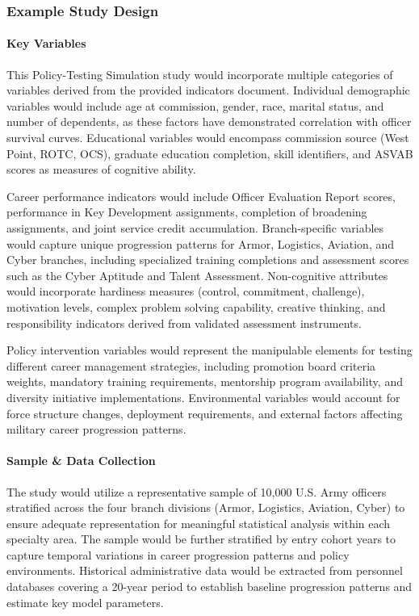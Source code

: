 \documentclass[main.tex]{subfiles}
\begin{document}
\subsubsection{Example Study Design}

\paragraph{Key Variables}

This Policy-Testing Simulation study would incorporate multiple categories of variables derived from the provided indicators document\autocite{potential-indicators}. Individual demographic variables would include age at commission, gender, race, marital status, and number of dependents, as these factors have demonstrated correlation with officer survival curves. Educational variables would encompass commission source (West Point, ROTC, OCS), graduate education completion, skill identifiers, and ASVAB scores as measures of cognitive ability.

Career performance indicators would include Officer Evaluation Report scores, performance in Key Development assignments, completion of broadening assignments, and joint service credit accumulation. Branch-specific variables would capture unique progression patterns for Armor, Logistics, Aviation, and Cyber branches, including specialized training completions and assessment scores such as the Cyber Aptitude and Talent Assessment. Non-cognitive attributes would incorporate hardiness measures (control, commitment, challenge), motivation levels, complex problem solving capability, creative thinking, and responsibility indicators derived from validated assessment instruments.

Policy intervention variables would represent the manipulable elements for testing different career management strategies, including promotion board criteria weights, mandatory training requirements, mentorship program availability, and diversity initiative implementations. Environmental variables would account for force structure changes, deployment requirements, and external factors affecting military career progression patterns.

\paragraph{Sample \& Data Collection}

The study would utilize a representative sample of 10,000 U.S. Army officers stratified across the four branch divisions (Armor, Logistics, Aviation, Cyber) to ensure adequate representation for meaningful statistical analysis within each specialty area\autocite{bullinaria2018}. The sample would be further stratified by entry cohort years to capture temporal variations in career progression patterns and policy environments. Historical administrative data would be extracted from personnel databases covering a 20-year period to establish baseline progression patterns and estimate key model parameters.
\end{document}
